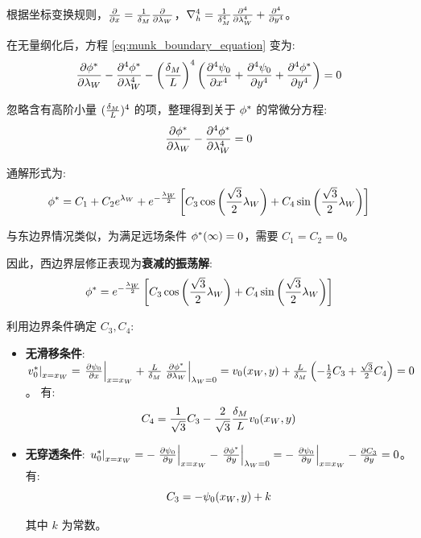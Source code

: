根据坐标变换规则，$\pde{}{x} = \frac{1}{\delta_M} \pde{}{\lambda_W}$，$\nabla_h^4 = \frac{1}{\delta_M^4} \pde[4]{}{\lambda_W} + \pde[4]{}{y}$。

在无量纲化后，方程 \eqref{eq:munk_boundary_equation} 变为:
\begin{equation*}
    \pde{\flayer{\phi}}{\lambda_W} - \pde[4]{\flayer{\phi}}{\lambda_W} - \left(\frac{\delta_M}{\hscale}\right)^4 \left(\pde[4]{\streamfunc_0}{x} + \pde[4]{\streamfunc_0}{y} + \pde[4]{\flayer{\phi}}{y}\right) = 0
\end{equation*}

忽略含有高阶小量 $(\frac{\delta_M}{L})^4$ 的项，整理得到关于 $\phi^*$ 的常微分方程:
\begin{equation}
    \pde{\flayer{\phi}}{\lambda_W} - \pde[4]{\flayer{\phi}}{\lambda_W} = 0
    \label{eq:munk_ode_west}
\end{equation}

通解形式为:
\begin{equation*}
    \phi^* = C_1 + C_2 e^{\lambda_W} + e^{-\frac{\lambda_W}{2}} \left[C_3 \cos\left(\frac{\sqrt{3}}{2}\lambda_W\right) + C_4 \sin\left(\frac{\sqrt{3}}{2}\lambda_W\right)\right]
\end{equation*}

与东边界情况类似，为满足远场条件 $\phi^*(\infty) = 0$，需要 $C_1 = C_2 = 0$。

因此，西边界层修正表现为\textbf{衰减的振荡解}:
\begin{equation*}
    \phi^* = e^{-\frac{\lambda_W}{2}} \left[C_3 \cos\left(\frac{\sqrt{3}}{2}\lambda_W\right) + C_4 \sin\left(\frac{\sqrt{3}}{2}\lambda_W\right)\right]
\end{equation*}

利用边界条件确定 $C_3, C_4$:
\begin{itemize}
    \item \textbf{无滑移条件}: $\left.\flayer{v_0}\right|_{x=x_W} = \left.\pde{\streamfunc_0}{x}\right|_{x=x_W} + \frac{\hscale}{\delta_M} \left.\pde{\flayer{\phi}}{\lambda_W}\right|_{\lambda_W=0} = v_0(x_W, y) + \frac{\hscale}{\delta_M} \left(-\frac{1}{2} C_3 + \frac{\sqrt{3}}{2} C_4\right) = 0$。
    有:
    \begin{equation*}
        C_4 = \frac{1}{\sqrt{3}} C_3 - \frac{2}{\sqrt{3}} \frac{\delta_M}{L} v_0(x_W, y)
    \end{equation*}

    \item \textbf{无穿透条件}: $\left.\flayer{u_0}\right|_{x=x_W} = -\left.\pde{\streamfunc_0}{y}\right|_{x=x_W} - \left.\pde{\flayer{\phi}}{y}\right|_{\lambda_W=0} = -\left.\pde{\streamfunc_0}{y}\right|_{x=x_W} - \pde{C_3}{y} = 0$。
    有:
    \begin{equation*}
        C_3 = -\psi_0(x_W, y) + k
    \end{equation*}

    其中 $k$ 为常数。
\end{itemize}

